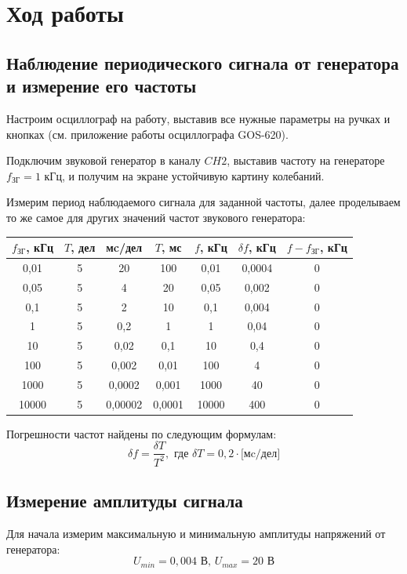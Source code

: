 \documentclass[a4paper, 12pt]{article} %
\begin{document}
\section{Ход работы}

\subsection{Наблюдение периодического сигнала от генератора и
измерение его частоты}

Настроим осциллограф на работу, выставив все нужные параметры на ручках и кнопках (см. приложение работы осциллографа GOS-620).

Подключим звуковой генератор в каналу $CH2$, выставив частоту на генераторе $f_{\text{ЗГ}} = 1$ кГц, и получим на экране устойчивую картину колебаний.

Измерим период наблюдаемого сигнала для заданной частоты, далее проделываем то же самое для других значений частот звукового генератора:
\begin{center}
\begin{tabular}{|c|c|c|c|c|c|c|}
\hline 
$f_{\text{ЗГ}}$, кГц & $T$, дел & мc/дел & $T$, мс & $f$, кГц & $\delta f$, кГц & $f - f_{\text{ЗГ}}$, кГц  \\ 
\hline 
0,01 & 5 & 20 & 100 & 0,01 & 0,0004 & 0 \\ 
\hline 
0,05 & 5 & 4 & 20 & 0,05 & 0,002 & 0 \\ 
\hline 
0,1 & 5 & 2 & 10 & 0,1 & 0,004 & 0 \\ 
\hline 
1 & 5 & 0,2 & 1 & 1 & 0,04 & 0 \\ 
\hline 
10 & 5 & 0,02 & 0,1 & 10 & 0,4 & 0 \\ 
\hline 
100 & 5 & 0,002 & 0,01 & 100 & 4 & 0 \\ 
\hline 
1000 & 5 & 0,0002 & 0,001 & 1000 & 40 & 0 \\ 
\hline 
10000 & 5 & 0,00002 & 0,0001 & 10000 & 400 & 0 \\ 
\hline 
\end{tabular}
\end{center}

Погрешности частот найдены по следующим формулам:
\[ \delta f = \frac{\delta T}{T^2},\text{ где } \delta T = 0,2 \cdot \text{[мc/дел]}\]

\subsection{Измерение амплитуды сигнала}

Для начала измерим максимальную и минимальную амплитуды напряжений от генератора:
\[U_{min} = 0,004 \text{ В, } U_{max} = 20 \text{ В}\]
\end{document}
